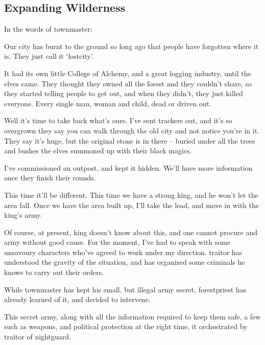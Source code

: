 \begin{multicols}{2}

\subsection{Expanding Wilderness}
\label{expanding_wilderness}

\noindent
In the words of \gls{townmaster}:

\begin{exampletext}

  Our city has burnt to the ground so long ago that people have forgotten where it is.
  They just call it `\gls{lostcity}'.

  It had its own little College of Alchemy, and a great logging industry, until the elves came.
  They thought they owned all the forest and they couldn't share, so they started telling people to get out, and when they didn't, they just killed everyone.
  Every single man, woman and child, dead or driven out.

  Well it's time to take back what's ours.
  I've sent trackers out, and it's so overgrown they say you can walk through the old city and not notice you're in it.
  They say it's huge, but the original stone is in there -- buried under all the trees and bushes the elves summoned up with their black magics.

  I've commissioned an outpost, and kept it hidden.
  We'll have more information once they finish their rounds.

  This time it'll be different.
  This time we have a strong king, and he won't let the area fall.
  Once we have the area built up, I'll take the lead, and move in with the king's army.

  Of course, at present, \gls{king} doesn't know about this, and one cannot procure and army without good cause.
  For the moment, I've had to speak with some unsavoury characters who've agreed to work under my direction.
  \Gls{traitor} has understood the gravity of the situation, and has organized some criminals he knows to carry out their orders.

\end{exampletext}

While \gls{townmaster} has kept his small, but illegal army secret, \gls{forestpriest} has already learned of it, and decided to intervene.

This secret army, along with all the information required to keep them safe, a few such as weapons, and political protection at the right time, it orchestrated by \gls{traitor} of \gls{nightguard}.


\end{multicols}
